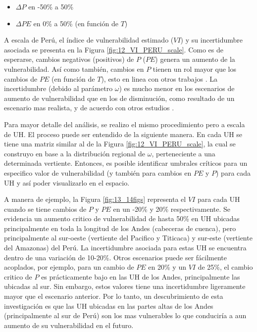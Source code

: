 \documentclass[12pt]{article}
\begin{document}
\begin{itemize}

	\item $\Delta P$ en -50\% a 50\%
	\item $\Delta PE$ en 0\% a 50\% (en función de $T$)

\end{itemize}

A escala de Perú, el índice de vulnerabilidad estimado ($VI$) y su incertidumbre asociada se presenta en la Figura \ref{fig:12_VI_PERU_scale}. Como es de esperarse, cambios negativos (positivos) de $P$ ($PE$) genera un aumento de la vulnerabilidad. Así como también, cambios en $P$ tienen un rol mayor que los cambios de $PE$ (en función de $T$), esto en linea con otros trabajos \citep{Singh2015}. La incertidumbre (debido al parámetro $\omega$) es mucho menor en los escenarios de aumento de vulnerabilidad que en los de disminución, como resultado de un escenario mas realista, y de acuerdo con otros estudios \citep{singh2011trading,Singh2015}.



Para mayor detalle del análisis, se realizo el mismo procedimiento pero a escala de UH. El proceso puede ser entendido de la siguiente manera. En cada UH se tiene una matriz similar al de la Figura \ref{fig:12_VI_PERU_scale}, la cual se construyo en base a la distribución regional de $\omega$, perteneciente a una determinada vertiente. Entonces, es posible identificar umbrales críticos para un especifico valor de vulnerabilidad (y también para cambios en $PE$ y $P$) para cada UH y así poder visualizarlo en el espacio.

A manera de ejemplo, la Figura \ref{fig:13_14figs} representa el $VI$ para cada UH cuando se tiene cambios de $P$ y $PE$ en un -20\% y 20\% respectivamente. Se evidencia un aumento critico de vulnerabilidad de hasta 50\% en UH ubicadas principalmente en toda la longitud de los Andes (cabeceras de cuenca), pero principalmente al sur-oeste (vertiente del Pacifico y Titicaca) y sur-este (vertiente del Amazonas) del Perú. La incertidumbre asociada para estas UH se encuentra dentro de una variación de 10-20\%. Otros escenarios puede ser fácilmente acoplados, por ejemplo, para un cambio de $PE$ en 20\% y un $VI$ de 25\%, el cambio critico de $P$ es prácticamente bajo en las UH de los Andes, principalmente las ubicadas al sur. Sin embargo, estos valores tiene una incertidumbre ligeramente mayor que el escenario anterior. Por lo tanto, un descubrimiento de esta investigación es que las UH ubicadas en las partes altas de los Andes (principalmente al sur de Perú) son los mas vulnerables lo que conduciría a aun aumento de su vulnerabilidad en el futuro.
\end{document}
